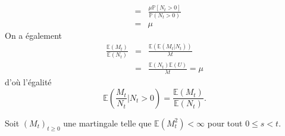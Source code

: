 \documentclass[11pts]{exam}
\newcommand*{\E}{\mathbb{E}}
\newcommand*{\F}{\mathcal{F}}
\begin{document}
\begin{questions}
\begin{parts}
\begin{solution}
\begin{eqnarray*}
&=&\frac{\mu\mathbb{P}\left[N_t>0\right]}{\mathbb{P}(N_t>0)}\\
&=&\mu
\end{eqnarray*}
On a également
\begin{eqnarray*} 
\frac{\mathbb{E}(M_t)}{\mathbb{E}(N_t)}&=& \frac{\mathbb{E}(\mathbb{E}(M_t|N_t))}{\lambda t}\\
&=& \frac{\mathbb{E}(N_t)\mathbb{E}(U)}{\lambda t} = \mu
\end{eqnarray*}
d'où l'égalité 
$$
\mathbb{E}\left(\frac{M_t}{N_t}\Big\rvert N_t>0\right) = \frac{\mathbb{E}(M_t)}{\mathbb{E}(N_t)}.
$$
\end{solution}
\end{parts}
\question Soit $(M_t)_{t\geq 0}$ une martingale telle que $\E(M_t^2)<\infty$ pour tout $0\leq s< t$.
\end{questions}
\end{document}
